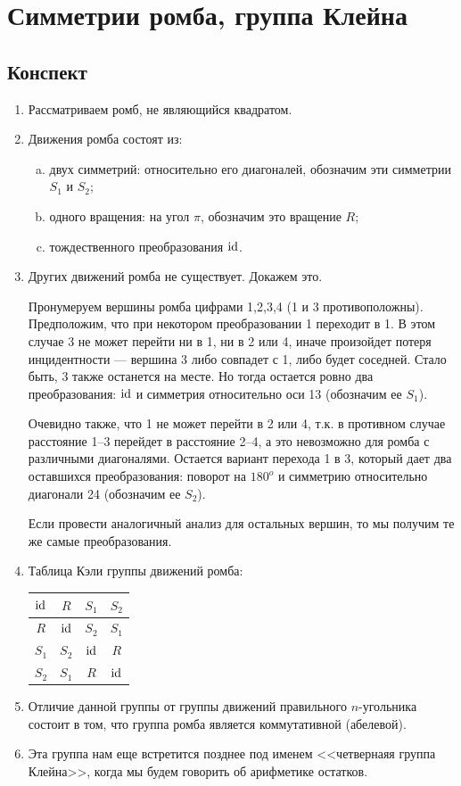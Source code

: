\section{Симметрии ромба, группа Клейна}

\subsection*{Конспект}
\begin{enumerate}\setlength{\itemsep}{1pt}
\item Рассматриваем ромб, не являющийся квадратом.
\item Движения ромба состоят из:
\begin{enumerate}[a)]
\item двух симметрий: относительно его диагоналей, обозначим эти симметрии $S_1$ и $S_2$;
\item одного вращения: на угол $\pi$, обозначим это вращение $R$;
\item тождественного преобразования $\mathrm{id}$.
\end{enumerate}
\item Других движений ромба не существует. Докажем это.

Пронумеруем вершины ромба цифрами 1,2,3,4 (1 и 3 противоположны). Предположим, что при некотором преобразовании 1 переходит в 1. В этом случае 3 не может перейти ни в 1, ни в 2 или 4, иначе произойдет потеря инцидентности --- вершина 3 либо совпадет с 1, либо будет соседней. Стало быть, 3 также останется на месте. Но тогда остается ровно два преобразования: $\mathrm{id}$ и симметрия относительно оси 13 (обозначим ее $S_1$).

Очевидно также, что 1 не может перейти в 2 или 4, т.к. в противном случае расстояние 1--3 перейдет в расстояние 2--4, а это невозможно для ромба с различными диагоналями. Остается вариант перехода 1 в 3, который дает два оставшихся преобразования: поворот на $180^o$ и симметрию относительно диагонали 24 (обозначим ее $S_2$).

Если провести аналогичный анализ для остальных вершин, то мы получим те же самые преобразования.
\item Таблица Кэли группы движений ромба:\hfill
\begin{tabular}{c|c|c|c|}
$\mathrm{id}$     & $R$ & $S_1$ & $S_2$ \\
\hline
$R$ & $\mathrm{id}$     & $S_2$ & $S_1$ \\
\hline
$S_1$     & $S_2$     & $\mathrm{id}$ & $R$ \\
\hline
$S_2$     & $S_1$     & $R$ & $\mathrm{id}$ \\
\hline
\end{tabular}

\item Отличие данной группы от группы движений правильного $n$-угольника состоит в том, что группа ромба является коммутативной (абелевой).
\item Эта группа нам еще встретится позднее под именем <<четвернаяя группа Клейна>>, когда мы будем говорить об арифметике остатков.
\end{enumerate}



